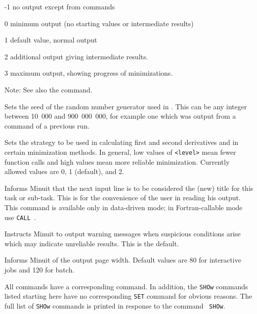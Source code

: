 \begin{DLtt}{12}
\item[-1]            no output except from  commands
\item[\phantom{-}0]  minimum output (no starting values or intermediate results)
\item[\phantom{-}1]  default value, normal output
\item[\phantom{-}2]  additional output giving intermediate results.
\item[\phantom{-}3]  maximum output, showing progress of minimizations.
\end{DLtt}
 
Note: See also the  command.


Sets the seed of the random number generator used in .  
This can be any integer between 10~000 and 900~000~000, for example
one which was output from a  command of a previous run.


Sets the strategy to be used in calculating first and second derivatives
and in certain minimization methods. In general, low values of \texttt{<level>}
mean fewer function calls and high values mean more reliable minimization.
Currently allowed values are 0, 1 (default), and 2.


Informs Minuit that the next input line is to be considered the (new)
title for this task or sub-task.  This is for the convenience of
the user in reading his output. This command is available only in data-driven
mode; in Fortran-callable mode use \texttt{CALL}~.


Instructs Minuit to output warning messages when suspicious conditions
arise which may indicate unreliable results.
This is the default.

Informs Minuit of the output page width. Default values are 80 for
interactive jobs and 120 for batch.


All  commands have a corresponding  command.
In addition, the \texttt{SHOw} commands listed starting here have no corresponding
\texttt{SET} command for obvious reasons.  The full list of \texttt{SHOw} commands
is printed in response to the command ~\texttt{SHOw}.

